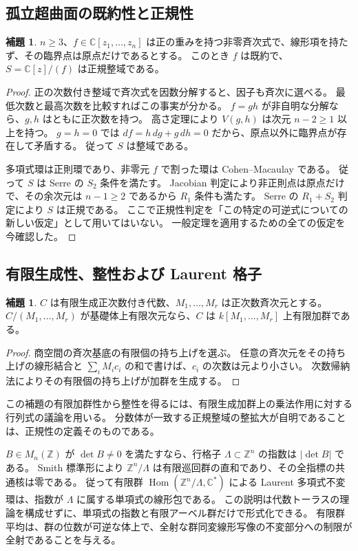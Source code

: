 \documentclass[11pt,a4paper]{ltjsarticle}
\numberwithin{equation}{section}
\theoremstyle{definition}
\newtheorem{lemma}[theorem]{補題}
\newcommand{\Z}{\mathbb Z}\newcommand{\N}{\mathbb N}\newcommand{\Q}{\mathbb Q}\newcommand{\C}{\mathbb C}
\begin{document}
\subsection{孤立超曲面の既約性と正規性}
\begin{lemma}\label{lem:isolatednormal}
$n\ge3$、$f\in\C[z_1,\dots,z_n]$ は正の重みを持つ非零斉次式で、線形項を持たず、その臨界点は原点だけであるとする。
このとき $f$ は既約で、$S=\C[z]/(f)$ は正規整域である。
\end{lemma}
\begin{proof}
正の次数付き整域で斉次式を因数分解すると、因子も斉次に選べる。
最低次数と最高次数を比較すればこの事実が分かる。
$f=gh$ が非自明な分解なら、$g,h$ はともに正次数を持つ。
高さ定理により $V(g,h)$ は次元 $n-2\ge1$ 以上を持つ。
$g=h=0$ では $df=h\,dg+g\,dh=0$ だから、原点以外に臨界点が存在して矛盾する。
従って $S$ は整域である。

多項式環は正則環であり、非零元 $f$ で割った環は Cohen--Macaulay である。
従って $S$ は Serre の $S_2$ 条件を満たす。
Jacobian 判定により非正則点は原点だけで、その余次元は $n-1\ge2$ であるから $R_1$ 条件も満たす。
Serre の $R_1+S_2$ 判定により $S$ は正規である。
ここで正規性判定を「この特定の可逆式についての新しい仮定」として用いてはいない。
一般定理を適用するための全ての仮定を今確認した。
\end{proof}

\subsection{有限生成性、整性および Laurent 格子}
\begin{lemma}\label{lem:finitehomogeneous}
$C$ は有限生成正次数付き代数、$M_1,\dots,M_r$ は正次数斉次元とする。
$C/(M_1,\dots,M_r)$ が基礎体上有限次元なら、$C$ は $k[M_1,\dots,M_r]$ 上有限加群である。
\end{lemma}
\begin{proof}
商空間の斉次基底の有限個の持ち上げを選ぶ。
任意の斉次元をその持ち上げの線形結合と $\sum_iM_i c_i$ の和で書けば、$c_i$ の次数は元より小さい。
次数帰納法によりその有限個の持ち上げが加群を生成する。
\end{proof}
この補題の有限加群性から整性を得るには、有限生成加群上の乗法作用に対する行列式の議論を用いる。
分数体が一致する正規整域の整拡大が自明であることは、正規性の定義そのものである。

$B\in M_n(\Z)$ が $\det B\ne0$ を満たすなら、行格子 $\Lambda\subset\Z^n$ の指数は $|\det B|$ である。
Smith 標準形により $\Z^n/\Lambda$ は有限巡回群の直和であり、その全指標の共通核は零である。
従って有限群 $\operatorname{Hom}(\Z^n/\Lambda,\C^*)$ による Laurent 多項式不変環は、指数が $\Lambda$ に属する単項式の線形包である。
この説明は代数トーラスの理論を構成せずに、単項式の指数と有限アーベル群だけで形式化できる。
有限群平均は、群の位数が可逆な体上で、全射な群同変線形写像の不変部分への制限が全射であることを与える。
\end{document}

